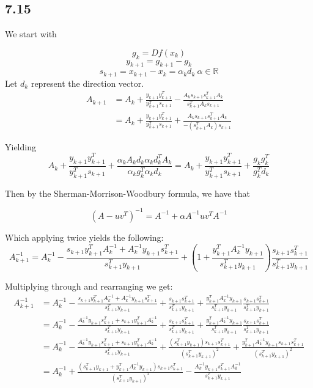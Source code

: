 \documentclass[letterpaper,12pt]{article}
\theoremstyle{definition}
\begin{document}
\subsection*{7.15}

We start with


\[g_k=Df(x_k)\]
\[y_{k+1}=g_{k+1}-g_{k}\]
\[s_{k+1}=x_{k+1}-x_k=\alpha_kd_k ~ \alpha \in \mathbb{R}\] 
Let $d_k$ represent the direction vector.\\
\begin{align*}
A_{k+1}&=A_k+\frac{y_{k+1}y_{k+1}^T}{y_{k+1}^Ts_{k+1}}-\frac{A_ks_{k+1}s_{k+1}^TA_k}{s^T_{k+1}A_ks_{k+1}}
\\&=A_k+\frac{y_{k+1}y_{k+1}^T}{y_{k+1}^Ts_{k+1}}+\frac{A_ks_{k+1}s_{k+1}^TA_k}{-(s^T_{k+1}A_k)s_{k+1}}
\end{align*}

Yielding
\[A_k+\frac{y_{k+1}y_{k+1}^T}{y_{k+1}^Ts_{k+1}}+\frac{\alpha_kA_kd_k\alpha_kd_k^TA_k}{\alpha_k g_k^T \alpha_k d_k}=A_k+\frac{y_{k+1}y_{k+1}^T}{y_{k+1}^Ts_{k+1}}+\frac{g_kg_k^T}{g^T_kd_k}\]

Then by the Sherman-Morrison-Woodbury formula, we have that

\[(A-uv^T)^{-1}=A^{-1}+\alpha A^{-1} uv^T A^{-1}\]

Which applying twice yields the following:\\

\[A_{k+1}^{-1}=A_k^{-1}-\frac{s_{k+1}y_{k+1}^TA^{-1}_k+A_k^{-1} y_{k+1} s_{k+1}^T}{s^T_{k+1}y_{k+1}}+(1+\frac{y^T_{k+1}A_k^{-1}y_{k+1}}{s_{k+1}^Ty_{k+1}})\frac{s_{k+1}s_{k+1}^T}{s^T_{k+1}y_{k+1}}\]

Multiplying through and rearranging we get:\\
\begin{align*}
A_{k+1}^{-1}&=A_k^{-1}-\frac{s_{k+1}y_{k+1}^TA^{-1}_k+A_k^{-1} y_{k+1} s_{k+1}^T}{s^T_{k+1}y_{k+1}}+\frac{s_{k+1}s_{k+1}^T}{s^T_{k+1}y_{k+1}}+\frac{y^T_{k+1}A_k^{-1}y_{k+1}}{s_{k+1}^Ty_{k+1}}\frac{s_{k+1}s_{k+1}^T}{s^T_{k+1}y_{k+1}}\\
&=A_k^{-1}-\frac{A_k^{-1} y_{k+1} s_{k+1}^T+s_{k+1}y_{k+1}^TA^{-1}_k}{s^T_{k+1}y_{k+1}}+\frac{s_{k+1}s_{k+1}^T}{s^T_{k+1}y_{k+1}}+\frac{y^T_{k+1}A_k^{-1}y_{k+1}}{s_{k+1}^Ty_{k+1}}\frac{s_{k+1}s_{k+1}^T}{s^T_{k+1}y_{k+1}}\\
&=A_k^{-1}-\frac{A_k^{-1} y_{k+1} s_{k+1}^T+s_{k+1}y_{k+1}^TA^{-1}_k}{s^T_{k+1}y_{k+1}}+\frac{(s_{k+1}^Ty_{k+1})s_{k+1}s_{k+1}^T}{(s^T_{k+1}y_{k+1})^2}+\frac{y^T_{k+1}A_k^{-1}y_{k+1}s_{k+1}s_{k+1}^T}{(s_{k+1}^Ty_{k+1})^2}\\
&=A_k^{-1}+\frac{(s^T_{k+1}y_{k+1}+y_{k+1}^TA_k^{-1}y_{k+1})s_{k+1}s_{k+1}^T}{(s_{k+1}^Ty_{k+1})^2}-\frac{A^{-1}_ky_{k+1}s_{k+1}^TA^{-1}_k}{s_{k+1}^Ty_{k+1}}\\
\end{align*}
\end{document}
